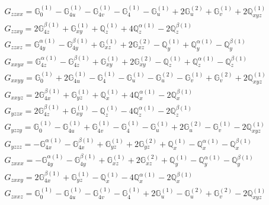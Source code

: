 \documentclass[fleqn,8pt,landscape]{jsarticle}
\begin{document}
\begin{align*}
& G_{zzxx} = \mathbb{G}_{0}^{(1)} - \mathbb{G}_{4u}^{(1)} - \mathbb{G}_{4v}^{(1)} - \mathbb{G}_{4}^{(1)} - \mathbb{G}_{u}^{(1)} + 2 \mathbb{G}_{u}^{(2)} + \mathbb{G}_{v}^{(1)} + 2 \mathbb{Q}_{xyz}^{(1)} \\
& G_{zzxy} = 2 \mathbb{G}_{4z}^{\beta(1)} + \mathbb{G}_{xy}^{(1)} + \mathbb{Q}_{z}^{(1)} + 4 \mathbb{Q}_{z}^{\alpha(1)} - 2 \mathbb{Q}_{z}^{\beta(1)} \\
& G_{zzxz} = \mathbb{G}_{4y}^{\alpha(1)} - \mathbb{G}_{4y}^{\beta(1)} + \mathbb{G}_{xz}^{(1)} + 2 \mathbb{G}_{xz}^{(2)} - \mathbb{Q}_{y}^{(1)} + \mathbb{Q}_{y}^{\alpha(1)} - \mathbb{Q}_{y}^{\beta(1)} \\
& G_{xxyx} = \mathbb{G}_{4z}^{\alpha(1)} - \mathbb{G}_{4z}^{\beta(1)} + \mathbb{G}_{xy}^{(1)} + 2 \mathbb{G}_{xy}^{(2)} - \mathbb{Q}_{z}^{(1)} + \mathbb{Q}_{z}^{\alpha(1)} - \mathbb{Q}_{z}^{\beta(1)} \\
& G_{xxyy} = \mathbb{G}_{0}^{(1)} + 2 \mathbb{G}_{4u}^{(1)} - \mathbb{G}_{4}^{(1)} - \mathbb{G}_{u}^{(1)} - \mathbb{G}_{u}^{(2)} - \mathbb{G}_{v}^{(1)} + \mathbb{G}_{v}^{(2)} + 2 \mathbb{Q}_{xyz}^{(1)} \\
& G_{xxyz} = 2 \mathbb{G}_{4x}^{\beta(1)} + \mathbb{G}_{yz}^{(1)} + \mathbb{Q}_{x}^{(1)} + 4 \mathbb{Q}_{x}^{\alpha(1)} - 2 \mathbb{Q}_{x}^{\beta(1)} \\
& G_{yzzx} = 2 \mathbb{G}_{4z}^{\beta(1)} + \mathbb{G}_{xy}^{(1)} - \mathbb{Q}_{z}^{(1)} - 4 \mathbb{Q}_{z}^{\alpha(1)} - 2 \mathbb{Q}_{z}^{\beta(1)} \\
& G_{yzzy} = \mathbb{G}_{0}^{(1)} - \mathbb{G}_{4u}^{(1)} + \mathbb{G}_{4v}^{(1)} - \mathbb{G}_{4}^{(1)} - \mathbb{G}_{u}^{(1)} + 2 \mathbb{G}_{u}^{(2)} - \mathbb{G}_{v}^{(1)} - 2 \mathbb{Q}_{xyz}^{(1)} \\
& G_{yzzz} = - \mathbb{G}_{4x}^{\alpha(1)} - \mathbb{G}_{4x}^{\beta(1)} + \mathbb{G}_{yz}^{(1)} + 2 \mathbb{G}_{yz}^{(2)} + \mathbb{Q}_{x}^{(1)} - \mathbb{Q}_{x}^{\alpha(1)} - \mathbb{Q}_{x}^{\beta(1)} \\
& G_{zxxx} = - \mathbb{G}_{4y}^{\alpha(1)} - \mathbb{G}_{4y}^{\beta(1)} + \mathbb{G}_{xz}^{(1)} + 2 \mathbb{G}_{xz}^{(2)} + \mathbb{Q}_{y}^{(1)} - \mathbb{Q}_{y}^{\alpha(1)} - \mathbb{Q}_{y}^{\beta(1)} \\
& G_{zxxy} = 2 \mathbb{G}_{4x}^{\beta(1)} + \mathbb{G}_{yz}^{(1)} - \mathbb{Q}_{x}^{(1)} - 4 \mathbb{Q}_{x}^{\alpha(1)} - 2 \mathbb{Q}_{x}^{\beta(1)} \\
& G_{zxxz} = \mathbb{G}_{0}^{(1)} - \mathbb{G}_{4u}^{(1)} - \mathbb{G}_{4v}^{(1)} - \mathbb{G}_{4}^{(1)} + 2 \mathbb{G}_{u}^{(1)} - \mathbb{G}_{u}^{(2)} + \mathbb{G}_{v}^{(2)} - 2 \mathbb{Q}_{xyz}^{(1)} \\

\end{align*}
\end{document}

